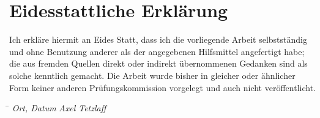 \newpage
\chapter*{Eidesstattliche Erklärung}
\thispagestyle{empty}
Ich erkläre hiermit an Eides Statt, dass ich die vorliegende Arbeit selbstständig und ohne Benutzung anderer als der angegebenen Hilfsmittel angefertigt habe; die aus fremden Quellen direkt oder indirekt übernommenen Gedanken sind  als solche kenntlich gemacht. Die Arbeit wurde bisher in gleicher oder ähnlicher Form keiner anderen Prüfungskommission vorgelegt und auch nicht veröffentlicht.
\vspace{3cm}
\begin{tabbing}
\hspace{6cm}  \= \kill
\textit{Ort, Datum} \> \textit{Axel Tetzlaff}
\end{tabbing}